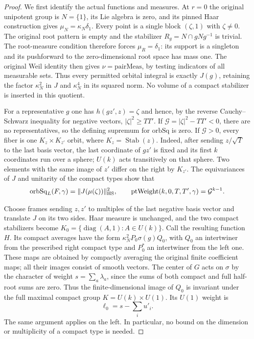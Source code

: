 \begin{proof}
We first identify the actual functions and measures.  At $r=0$ the
original unipotent group is $N=\{1\}$, its Lie algebra is zero,
and its pinned Haar construction gives $\mu_N=\kappa_N\delta_1$.
Every point is a single block $(\zeta,1)$ with $\zeta\ne0$.
The original root pattern is empty and the stabilizer
$R_g=N\cap gNg^{-1}$ is trivial.  The root-measure condition
therefore forces $\mu_R=\delta_1$: its support is a singleton and
its pushforward to the zero-dimensional root space has mass one.
The original Weil identity then gives $\nu=\mathrm{pairMeas}$,
by testing indicators of all measurable sets.  Thus every permitted
orbital integral is exactly $J(g)$, retaining the factor
$\kappa_N^2$ in $J$ and $\kappa_N^4$ in its squared norm.  No
volume of a compact stabilizer is inserted in this quotient.

For a representative $g$ one has
$h(gz',z)=\zeta$ and hence, by the reverse Cauchy--Schwarz
inequality for negative vectors, $|\zeta|^2\ge TT'$.
If $\mathcal G=|\zeta|^2-TT'<0$, there are no representatives,
so the defining supremum for $\mathrm{orbSq}$ is zero.
If $\mathcal G>0$, every fiber is one
$K_z\times K_{z'}$ orbit, where $K_z=\operatorname{Stab}(z)$.
Indeed, after sending $z/\sqrt T$ to the last basis vector,
the last coordinate of $gz'$ is fixed and its first $k$
coordinates run over a sphere; $U(k)$ acts transitively on that
sphere.  Two elements with the same image of $z'$ differ on
the right by $K_{z'}$.  The equivariances of $J$ and unitarity
of the compact types show that
\begin{equation}\label{rank-zero-point-identification}
 \mathrm{orbSq}_L(F,\gamma)=\|J(\mu(\zeta))\|_{\rm HS}^2,
 \qquad \mathrm{ptWeight}(k,0,T,T',\gamma)=\mathcal G^{k-1}.
\end{equation}

Choose frames sending $z,z'$ to multiples of the last negative
basis vector and translate $J$ on its two sides.  Haar measure
is unchanged, and the two compact stabilizers become
$K_0=\{\operatorname{diag}(A,1):A\in U(k)\}$.  Call the resulting
function $H$.  Its compact averages have the form
$\kappa_N^2 P_0\sigma(g)Q_0$, with $Q_0$ an intertwiner from
the prescribed right compact type and $P_0^*$ an intertwiner
from the left one.  These maps are obtained by compactly averaging
the original finite coefficient maps; all their images consist of
smooth vectors.  The center of $G$ acts on $\sigma$ by the
character of weight $s=\sum_a\lambda_a$, since the sums of both
compact and full half-root sums are zero.  Thus the finite-dimensional
image of $Q_0$ is invariant under the full maximal compact group
$K=U(k)\times U(1)$.  Its $U(1)$ weight is
\[
                \ell_0=s-\sum_i u'_i.
\]
The same argument applies on the left.  In particular, no bound
on the dimension or multiplicity of a compact type is needed.


\end{proof}
